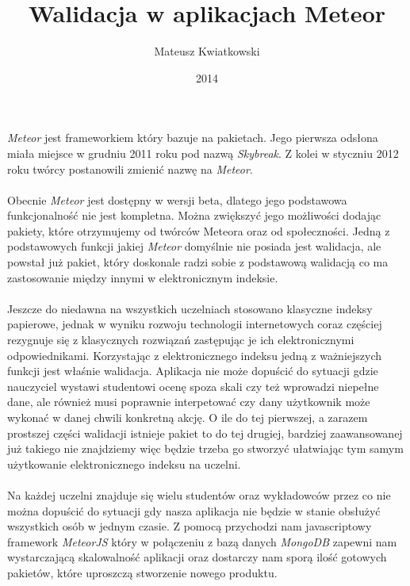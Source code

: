 \documentclass[brudnopis]{xmgr}
\author   {Mateusz Kwiatkowski}
\title    {Walidacja w aplikacjach Meteor}
\date     {2014}
\begin{document}
\begin{abstract}
\end{abstract}

\maketitle
%
\introduction

\textit{Meteor} jest frameworkiem który bazuje na pakietach. Jego pierwsza odsłona miała miejsce w grudniu 2011 roku pod nazwą \textit{Skybreak}.
Z kolei w styczniu 2012 roku twórcy postanowili zmienić nazwę na \textit{Meteor}. 
\\
\\
Obecnie \textit{Meteor} jest dostępny w wersji beta, dlatego jego
podstawowa funkcjonalność nie jest kompletna. Można zwiększyć jego możliwości dodając pakiety, które otrzymujemy
od twórców Meteora oraz od społeczności.
Jedną z podstawowych funkcji jakiej \textit{Meteor} domyślnie nie posiada jest walidacja, ale powstał już pakiet, który doskonale radzi
sobie z podstawową walidacją co ma zastosowanie między innymi w elektronicznym indeksie.
\\
\\
Jeszcze do niedawna na wszystkich uczelniach stosowano klasyczne indeksy
papierowe, jednak w wyniku rozwoju technologii internetowych coraz częściej
rezygnuje się z klasycznych rozwiązań zastępując je ich elektronicznymi odpowiednikami.
Korzystając z elektronicznego indeksu jedną z ważniejszych funkcji jest właśnie walidacja. Aplikacja nie może dopuścić do
sytuacji gdzie nauczyciel wystawi studentowi ocenę spoza skali czy też wprowadzi niepełne dane, ale również musi
poprawnie interpetować czy dany użytkownik może wykonać w danej chwili konkretną akcję. O ile do tej pierwszej, a zarazem prostszej części
walidacji istnieje pakiet to do tej drugiej, bardziej zaawansowanej już takiego nie znajdziemy więc będzie trzeba go stworzyć ułatwiając tym samym
użytkowanie elektronicznego indeksu na uczelni.
\\
\\
Na każdej uczelni znajduje się wielu studentów oraz wykładowców przez co nie można dopuścić do sytuacji gdy nasza
aplikacja nie będzie w stanie obsłużyć wszystkich osób w jednym czasie. Z pomocą przychodzi nam javascriptowy
framework \textit{MeteorJS} który w połączeniu z bazą danych \textit{MongoDB} zapewni nam wystarczającą skalowalność
aplikacji oraz dostarczy nam sporą ilość gotowych pakietów, które uproszczą stworzenie nowego produktu.
\end{document}
